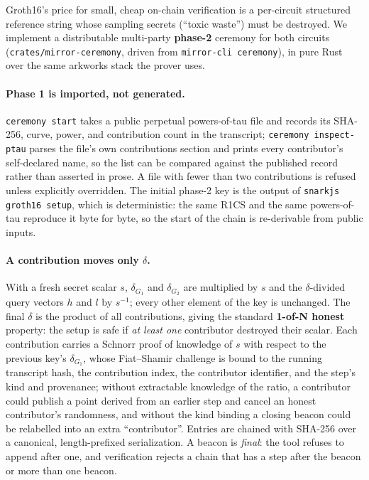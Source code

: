 \documentclass[10pt]{article}
\newcommand{\code}[1]{\texttt{#1}}
\begin{document}
Groth16's price for small, cheap on-chain verification is a per-circuit structured
reference string whose sampling secrets (``toxic waste'') must be destroyed. We
implement a distributable multi-party \textbf{phase-2} ceremony for both circuits
(\code{crates/mirror-ceremony}, driven from \code{mirror-cli ceremony}), in pure
Rust over the same arkworks stack the prover uses.

\paragraph{Phase 1 is imported, not generated.} \code{ceremony start} takes a public
perpetual powers-of-tau file and records its SHA-256, curve, power, and contribution
count in the transcript; \code{ceremony inspect-ptau} parses the file's own
contributions section and prints every contributor's self-declared name, so the list
can be compared against the published record rather than asserted in prose. A file
with fewer than two contributions is refused unless explicitly overridden. The
initial phase-2 key is the output of \code{snarkjs groth16 setup}, which is
deterministic: the same R1CS and the same powers-of-tau reproduce it byte for byte,
so the start of the chain is re-derivable from public inputs.

\paragraph{A contribution moves only $\delta$.} With a fresh secret scalar $s$,
$\delta_{G_1}$ and $\delta_{G_2}$ are multiplied by $s$ and the $\delta$-divided
query vectors $h$ and $l$ by $s^{-1}$; every other element of the key is unchanged.
The final $\delta$ is the product of all contributions, giving the standard
\textbf{1-of-N honest} property: the setup is safe if \emph{at least one} contributor
destroyed their scalar. Each contribution carries a Schnorr proof of knowledge of $s$
with respect to the previous key's $\delta_{G_1}$, whose Fiat--Shamir challenge is
bound to the running transcript hash, the contribution index, the contributor
identifier, and the step's kind and provenance; without extractable knowledge of the
ratio, a contributor could publish a point derived from an earlier step and cancel an
honest contributor's randomness, and without the kind binding a closing beacon could
be relabelled into an extra ``contributor''. Entries are chained with SHA-256 over a
canonical, length-prefixed serialization. A beacon is \emph{final}: the tool refuses
to append after one, and verification rejects a chain that has a step after the
beacon or more than one beacon.
\end{document}
